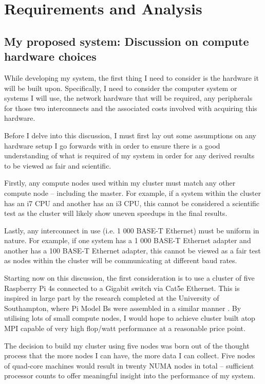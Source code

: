 \cleardoublepage
{}
\chapter{Requirements and Analysis}
\section{My proposed system: Discussion on compute hardware choices}
While developing my system, the first thing I need to consider is the hardware it will be built upon. Specifically, I need to consider the computer system or systems I will use, the network hardware that will be required, any peripherals for those two interconnects and the associated costs involved with acquiring this hardware.

Before I delve into this discussion, I must first lay out some assumptions on any hardware setup I go forwards with in order to ensure there is a good understanding of what is required of my system in order for any derived results to be viewed as fair and scientific.

Firstly, any compute nodes used within my cluster must match any other compute node -- including the master. For example, if a system within the cluster has an i7 CPU and another has an i3 CPU, this cannot be considered a scientific test as the cluster will likely show uneven speedups in the final results.

Lastly, any interconnect in use (i.e. 1 000 BASE-T Ethernet) must be uniform in nature. For example, if one system has a 1 000 BASE-T Ethernet adapter and another has a 100 BASE-T Ethernet adapter, this cannot be viewed as a fair test as nodes within the cluster will be communicating at different baud rates.
\vfill\break

\textbf{}

Starting now on this discussion, the first consideration is to use a cluster of five Raspberry Pi 4s connected to a Gigabit switch via Cat5e Ethernet. This is inspired in large part by the research completed at the University of Southampton, where Pi Model Bs were assembled in a similar manner \cite{cox_et_al_2013}. By utilising lots of small compute nodes, I would hope to achieve cluster built atop MPI capable of very high flop/watt performance at a reasonable price point.

The decision to build my cluster using five nodes was born out of the thought process that the more nodes I can have, the more data I can collect. Five nodes of quad-core machines would result in twenty NUMA nodes in total -- sufficient processor counts to offer meaningful insight into the performance of my system.

